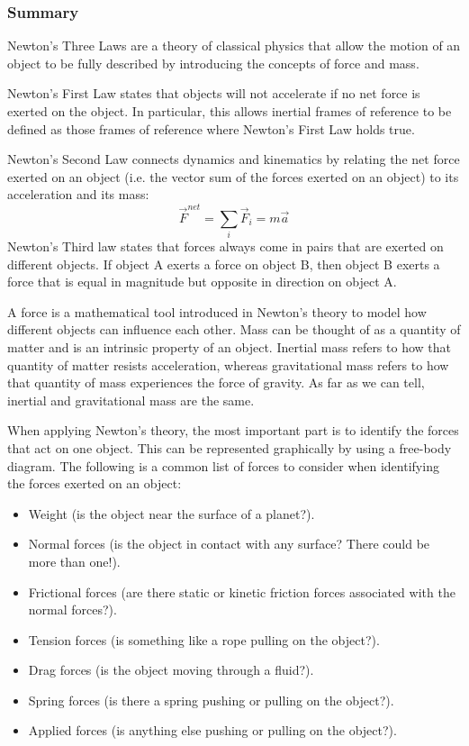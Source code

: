 \subsubsection{Summary}

Newton's Three Laws are a theory of classical physics that allow the motion of an object to be fully described by introducing the concepts of force and mass.

Newton's First Law states that objects will not accelerate if no net force is exerted on the object. In particular, this allows inertial frames of reference to be defined as those frames of reference where Newton's First Law holds true.

Newton's Second Law connects dynamics and kinematics by relating the net force exerted on an object (i.e. the vector sum of the forces exerted on an object) to its acceleration and its mass:
\begin{equation}
\vec F^{net} = \sum_i \vec F_i = m\vec a
\end{equation}
Newton's Third law states that forces always come in pairs that are exerted on different objects. If object A exerts a force on object B, then object B exerts a force that is equal in magnitude but opposite in direction on object A.

A force is a mathematical tool introduced in Newton's theory to model how different objects can influence each other. Mass can be thought of as a quantity of matter and is an intrinsic property of an object. Inertial mass refers to how that quantity of matter resists acceleration, whereas gravitational mass refers to how that quantity of mass experiences the force of gravity. As far as we can tell, inertial and gravitational mass are the same.

When applying Newton's theory, the most important part is to identify the forces that act on one object. This can be represented graphically by using a free-body diagram. The following is a common list of forces to consider when identifying the forces exerted on an object:

\begin{itemize}
\item Weight (is the object near the surface of a planet?).
\item Normal forces (is the object in contact with any surface? There could be more than one!).
\item Frictional forces (are there static or kinetic friction forces associated with the normal forces?).
\item Tension forces (is something like a rope pulling on the object?).
\item Drag forces (is the object moving through a fluid?).
\item Spring forces (is there a spring pushing or pulling on the object?).
\item Applied forces (is anything else pushing or pulling on the object?).
\end{itemize}

